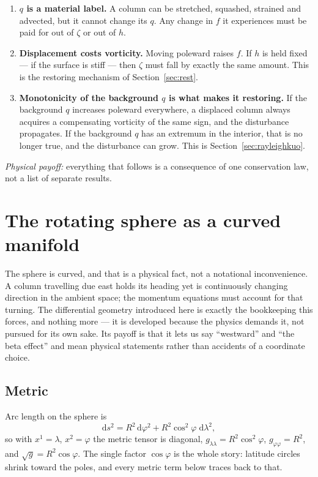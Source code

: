 \documentclass[11pt,a4paper]{article}
\newcommand{\dd}{\mathrm{d}}
\begin{document}
\begin{enumerate}
\item \textbf{$q$ is a material label.} A column can be stretched, squashed,
strained and advected, but it cannot change its $q$. Any change in $f$ it
experiences must be paid for out of $\zeta$ or out of $h$.
\item \textbf{Displacement costs vorticity.} Moving poleward raises $f$. If $h$
is held fixed --- if the surface is stiff --- then $\zeta$ must fall by exactly
the same amount. This is the restoring mechanism of Section~\ref{sec:rest}.
\item \textbf{Monotonicity of the background $q$ is what makes it restoring.} If
the background $q$ increases poleward everywhere, a displaced column always
acquires a compensating vorticity of the same sign, and the disturbance
propagates. If the background $q$ has an extremum in the interior, that is no
longer true, and the disturbance can grow. This is
Section~\ref{sec:rayleighkuo}.
\end{enumerate}

\medskip
\noindent\emph{Physical payoff:} everything that follows is a consequence of one
conservation law, not a list of separate results.

\section{The rotating sphere as a curved manifold}
\label{sec:geometry}

The sphere is curved, and that is a physical fact, not a notational
inconvenience. A column travelling due east holds its heading yet is
continuously changing direction in the ambient space; the momentum equations
must account for that turning. The differential geometry introduced here is
exactly the bookkeeping this forces, and nothing more --- it is developed
because the physics demands it, not pursued for its own sake. Its payoff is that
it lets us say ``westward'' and ``the beta effect'' and mean physical statements
rather than accidents of a coordinate choice.

\subsection{Metric}

Arc length on the sphere is
%
\begin{equation}
\dd s^2 = R^2\,\dd\varphi^2 + R^2\cos^2\!\varphi\;\dd\lambda^2 ,
\label{eq:metric}
\end{equation}
%
so with $x^1 = \lambda$, $x^2 = \varphi$ the metric tensor is diagonal,
$g_{\lambda\lambda} = R^2\cos^2\!\varphi$, $g_{\varphi\varphi} = R^2$, and
$\sqrt{g} = R^2\cos\varphi$. The single factor $\cos\varphi$ is the whole story:
latitude circles shrink toward the poles, and every metric term below traces
back to that.
\end{document}
